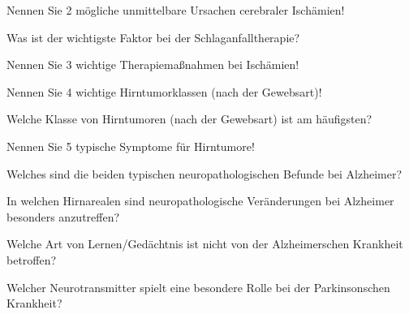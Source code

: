 \documentclass[10pt, a4paper]{exam}
\begin{document}
\begin{questions}
  \question Nennen Sie 2 mögliche unmittelbare Ursachen cerebraler Ischämien!
  \begin{solution}

  \end{solution}

  \question Was ist der wichtigste Faktor bei der Schlaganfalltherapie?
  \begin{solution}

  \end{solution}

  \question Nennen Sie 3 wichtige Therapiemaßnahmen bei Ischämien!
  \begin{solution}

  \end{solution}

  \question Nennen Sie 4 wichtige Hirntumorklassen (nach der Gewebsart)!
  \begin{solution}

  \end{solution}

  \question Welche Klasse von Hirntumoren (nach der Gewebsart) ist am häufigsten?
  \begin{solution}

  \end{solution}

  \question Nennen Sie 5 typische Symptome für Hirntumore!
  \begin{solution}

  \end{solution}

  \question Welches sind die beiden typischen neuropathologischen Befunde bei Alzheimer?
  \begin{solution}

  \end{solution}

  \question In welchen Hirnarealen sind neuropathologische Veränderungen bei Alzheimer besonders anzutreffen?
  \begin{solution}

  \end{solution}

  \question Welche Art von Lernen/Gedächtnis ist nicht von der Alzheimerschen Krankheit betroffen?
  \begin{solution}

  \end{solution}

  \question Welcher Neurotransmitter spielt eine besondere Rolle bei der Parkinsonschen Krankheit?
  \begin{solution}


\end{solution}
\end{questions}
\end{document}
